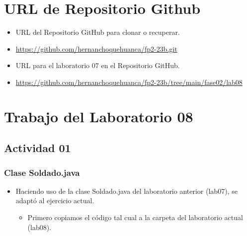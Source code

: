 \documentclass{article}
\begin{document}
	\section{URL de Repositorio Github}
	\begin{itemize}
		\item URL del Repositorio GitHub para clonar o recuperar.
        \item \url{https://github.com/hernanchoquehuanca/fp2-23b.git}
		\item URL para el laboratorio 07 en el Repositorio GitHub.
		\item \url{https://github.com/hernanchoquehuanca/fp2-23b/tree/main/fase02/lab08}
	\end{itemize}
	
	\section{Trabajo del Laboratorio 08}
        
        


    \subsection{Actividad 01}
    
        \subsubsection{Clase Soldado.java}
        \begin{itemize}	
            \item Haciendo uso de la clase Soldado.java del laboratorio anterior (lab07), se adaptó al ejercicio actual.
            \begin{itemize}
                \item Primero copiamos el código tal cual a la carpeta del laboratorio actual (lab08).
            \end{itemize}
        \end{itemize}
\end{document}
